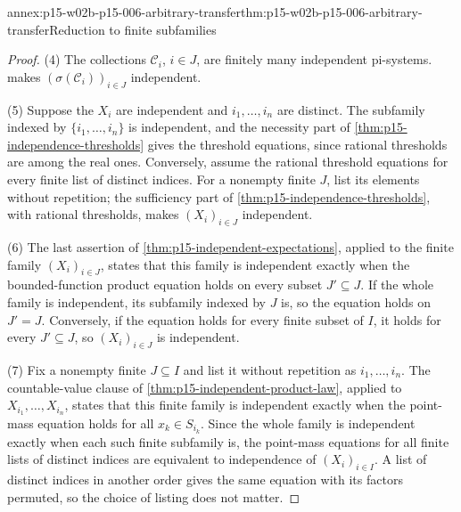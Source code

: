 \begin{annexitem}{annex:p15-w02b-p15-006-arbitrary-transfer}{thm:p15-w02b-p15-006-arbitrary-transfer}{Reduction to finite subfamilies}
\begin{proof}
(4) The collections \(\mathcal C_i\), \(i\in J\), are finitely many
independent pi-systems.  makes
\((\sigma(\mathcal C_i))_{i\in J}\) independent.

(5) Suppose the \(X_i\) are independent and \(i_1,\ldots,i_n\) are
distinct. The subfamily indexed by \(\{i_1,\ldots,i_n\}\) is
independent, and the necessity part of
\cref{thm:p15-independence-thresholds} gives the threshold equations,
since rational thresholds are among the real ones. Conversely, assume
the rational threshold equations for every finite list of distinct
indices. For a nonempty finite \(J\), list its elements without
repetition; the sufficiency part of
\cref{thm:p15-independence-thresholds}, with rational thresholds, makes
\((X_i)_{i\in J}\) independent.

(6) The last assertion of \cref{thm:p15-independent-expectations},
applied to the finite family \((X_i)_{i\in J}\), states that this
family is independent exactly when the bounded-function product
equation holds on every subset \(J'\subseteq J\). If the whole family is
independent, its subfamily indexed by \(J\) is, so the equation holds on
\(J'=J\). Conversely, if the equation holds for every finite subset of
\(I\), it holds for every \(J'\subseteq J\), so \((X_i)_{i\in J}\) is
independent.

(7) Fix a nonempty finite \(J\subseteq I\) and list it without
repetition as \(i_1,\ldots,i_n\). The countable-value clause of
\cref{thm:p15-independent-product-law}, applied to
\(X_{i_1},\ldots,X_{i_n}\), states that this finite family is
independent exactly when the point-mass equation holds for all
\(x_k\in S_{i_k}\). Since the whole family is independent exactly when
each such finite subfamily is, the point-mass equations for all finite
lists of distinct indices are equivalent to independence of
\((X_i)_{i\in I}\). A list of distinct indices in another order gives
the same equation with its factors permuted, so the choice of listing
does not matter.
\end{proof}
\end{annexitem}

